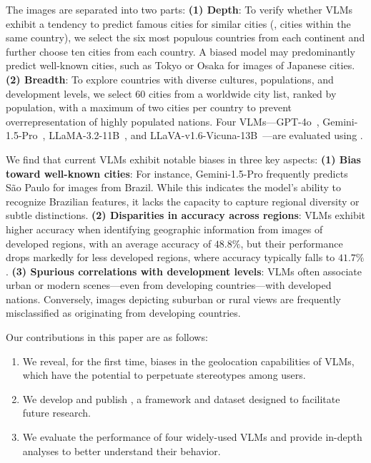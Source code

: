 The images are separated into two parts:
\textbf{(1) Depth}: To verify whether VLMs exhibit a tendency to predict famous cities for similar cities (\ie, cities within the same country), we select the six most populous countries from each continent and further choose ten cities from each country.
A biased model may predominantly predict well-known cities, such as Tokyo or Osaka for images of Japanese cities.
\textbf{(2) Breadth}: To explore countries with diverse cultures, populations, and development levels, we select 60 cities from a worldwide city list, ranked by population, with a maximum of two cities per country to prevent overrepresentation of highly populated nations.
Four VLMs—GPT-4o~\cite{openai2023gpt}, Gemini-1.5-Pro~\cite{pichai2024our}, LLaMA-3.2-11B~\cite{dubey2024llama3}, and LLaVA-v1.6-Vicuna-13B~\cite{liu2024visual}—are evaluated using {\methodname}.

We find that current VLMs exhibit notable biases in three key aspects:
\textbf{(1) Bias toward well-known cities}: For instance, Gemini-1.5-Pro frequently predicts S\~ao Paulo for images from Brazil.
While this indicates the model's ability to recognize Brazilian features, it lacks the capacity to capture regional diversity or subtle distinctions.
\textbf{(2) Disparities in accuracy across regions}: VLMs exhibit higher accuracy when identifying geographic information from images of developed regions, with an average accuracy of $48.8\%$, but their performance drops markedly for less developed regions, where accuracy typically falls to $41.7\%$.
\textbf{(3) Spurious correlations with development levels}: VLMs often associate urban or modern scenes—even from developing countries—with developed nations.
Conversely, images depicting suburban or rural views are frequently misclassified as originating from developing countries.

Our contributions in this paper are as follows:
\begin{enumerate}[leftmargin=*]
    \item We reveal, for the first time, biases in the geolocation capabilities of VLMs, which have the potential to perpetuate stereotypes among users.
    \item We develop and publish {\methodname}, a framework and dataset designed to facilitate future research.
    \item We evaluate the performance of four widely-used VLMs and provide in-depth analyses to better understand their behavior.
\end{enumerate}